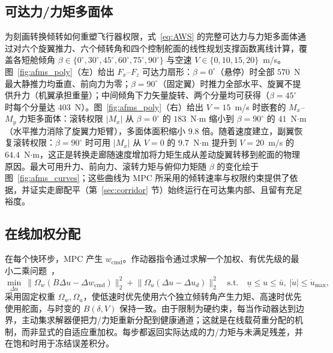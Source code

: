 \documentclass[UTF8,a4paper,11pt]{ctexart}
\begin{document}
\subsection{可达力/力矩多面体}\label{sec:afms_poly}
为刻画转换倾转如何重塑飞行器权限，式~\eqref{eq:AWS} 的完整可达力与力矩多面体通过对六个旋翼推力、六个倾转角和四个控制舵面的线性规划支撑函数离线计算，覆盖各短舱倾角 $\beta\in\{0^\circ,30^\circ,45^\circ,60^\circ,75^\circ,90^\circ\}$ 与空速 $V\in\{0,10,15,20\}$~m/s。图~\ref{fig:afms_poly}（左）给出 $F_x$--$F_z$ 可达力扇形：$\beta=0^\circ$（悬停）时全部 $570$~N 最大静推力均垂直、前向力为零；$\beta=90^\circ$（固定翼）时推力全部水平、旋翼不提供升力（机翼承担重量）；中间倾角下力矢量旋转、两个分量均可获得（$\beta=45^\circ$ 时每个分量达 $403$~N）。图~\ref{fig:afms_poly}（右）给出 $V=15$~m/s 时嵌套的 $M_x$--$M_y$ 力矩多面体：滚转权限 $|M_x|$ 从 $\beta=0^\circ$ 的 $183$~N$\cdot$m 缩小到 $\beta=90^\circ$ 的 $41$~N$\cdot$m（水平推力消除了旋翼力矩臂），多面体面积缩小 $9.8$ 倍。随着速度建立，副翼恢复滚转权限：$\beta=90^\circ$ 时可用 $|M_x|$ 从 $V=0$ 的 $9.7$~N$\cdot$m 提升到 $V=20$~m/s 的 $64.4$~N$\cdot$m，这正是转换走廊随速度增加将力矩生成从差动旋翼转移到舵面的物理原因。最大可用升力、前向力、滚转力矩与俯仰力矩随 $\beta$ 的变化绘于图~\ref{fig:afms_curves}；这些曲线为 MPC 所采用的倾转速率与权限约束提供了依据，并证实走廊配平（第~\ref{sec:corridor} 节）始终运行在可达集内部、且留有充足裕度。

\subsection{在线加权分配}\label{sec:alloc}
在每个快环步，MPC 产生 $w_{\mathrm{cmd}}$。作动器指令通过求解一个加权、有优先级的最小二乘问题~\cite{johansen2013survey,blaha2023survey,tohidi2020adaptive}，
\begin{equation}
\min_{\Delta u}\ \bigl\|\Omega_w(B\Delta u-\Delta w_{\mathrm{cmd}})\bigr\|_2^2
 +\bigl\|\Omega_u(\Delta u-\Delta u_d)\bigr\|_2^2
\quad\text{s.t.}\quad \underline u\le u\le\bar u,\ |\dot u|\le\dot u_{\max},
\label{eq:alloc}
\end{equation}
采用固定权重 $\Omega_w,\Omega_u$，使低速时优先使用六个独立倾转角产生力矩、高速时优先使用舵面，与时变的 $B(\delta,V)$ 保持一致。由于限制为硬约束，每当作动器达到边界，主动集求解器便把力/力矩重新分配到健康通道；这就是在线载荷重分配的机制，而非显式的自适应重加权。每步都返回实际达成的力/力矩与未满足残差，并在饱和时用于冻结误差积分。
\end{document}
